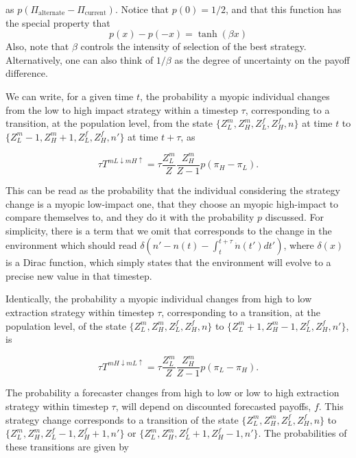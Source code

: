 \documentclass{article}
\begin{document}
as $p(\Pi_\text{alternate}-\Pi_\text{current})$. Notice that $p(0)=1/2$, and that this function has the special property that 
\begin{equation}
p(x)-p(-x) = \tanh(\beta x)
\end{equation}
Also, note that $\beta$ controls the intensity of selection of the best strategy. Alternatively,  one can also think of $1/\beta$ as the degree of uncertainty on the payoff difference.

We can write, for a given time $t$, the probability a myopic individual changes from the low to high impact strategy within a timestep $\tau$, corresponding to a transition, at the population level, from the state $\{Z^m_L, Z^m_H, Z^f_L, Z^f_H, n\}$ at time $t$ to $\{Z^m_L-1, Z^m_H+1, Z^f_L, Z^f_H, n'\}$ at time $t+\tau$, as

\begin{equation}
        \tau T^{mL\downarrow mH\uparrow} =
        \tau\frac{Z^m_L}{Z} \frac{Z^m_H}{Z-1} p(\pi_H-\pi_L).
\end{equation}

This can be read as the probability that the individual considering the strategy change is a myopic low-impact one, that they choose an myopic high-impact to compare themselves to, and they do it with the probability $p$ discussed. For simplicity, there is a term that we omit that corresponds to the change in the environment which should read $\delta\left(n'-n(t)-\int^{t+\tau}_{t}\dot{n}(t')dt'\right)$, where $\delta(x)$ is a Dirac function, which simply states that the environment will evolve to a precise new value in that timestep. 

Identically, the probability a myopic individual changes from high to low extraction strategy within timestep $\tau$, corresponding to a transition, at the population level, of the state $\{Z^m_L, Z^m_H, Z^f_L, Z^f_H, n\}$ to $\{Z^m_L+1, Z^m_H-1, Z^f_L, Z^f_H, n'\}$, is

\begin{equation}
        \tau T^{mH\downarrow mL\uparrow} =
        \tau\frac{Z^m_L}{Z} \frac{Z^m_H}{Z-1}  p(\pi_L-\pi_H).
\end{equation}

The probability a forecaster changes from high to low or low to high extraction strategy within timestep $\tau$, will depend on discounted forecasted payoffs, $f$. This strategy change  corresponds to a transition of the state $\{Z^m_L, Z^m_H, Z^f_L, Z^f_H, n\}$ to $\{Z^m_L, Z^m_H, Z^f_L-1, Z^f_H+1, n'\}$ or $\{Z^m_L, Z^m_H, Z^f_L+1, Z^f_H-1, n'\}$. The probabilities of these transitions are given by
\end{document}

